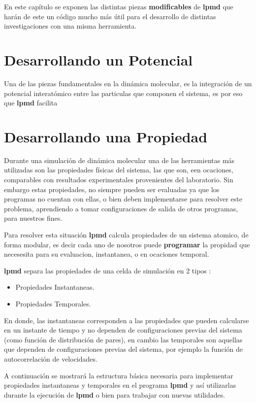 \documentclass[a4paper,10pt]{scrbook}
\newcommand{\lpmd}{\textbf{lpmd }}
\begin{document}
En este cap\'itulo se exponen las distintas piezas \textbf{modificables} de \lpmd que har\'an de este un c\'odigo mucho m\'as \'util para el desarrollo de distintas investigaciones con una misma herramienta.

\section{Desarrollando un Potencial}

Una de las piezas fundamentales en la din\'amica molecular, es la integraci\'on de un potencial interat\'omico entre las particulas que componen el sistema, es por eso que \lpmd facilita 

\section{Desarrollando una Propiedad}

Durante una simulaci\'on de din\'amica molecular una de las herramientas m\'as utilizadas  son las propiedades f\'isicas del sistema, las que son, een ocaciones, comparables con resultados experimentales provenientes del laboratorio. Sin embargo estas propiedades, no siempre pueden ser evaluadas ya que los programas no cuentan con ellas, o bien deben implementarse para resolver este problema, aprendiendo a tomar configuraciones de salida de otros programas, para nuestros fines.

Para resolver esta situaci\'on \lpmd calcula propiedades de un sistema atomico, de forma modular, es decir cada uno de nosotros puede \textbf{programar} la propidad que necesesita para su evaluacion, instantanea, o en ocaciones temporal.

\lpmd separa las propiedades de una celda de simulaci\'on en 2 tipos :

\begin{itemize}
 \item Propiedades Instantaneas.
 \item Propiedades Temporales.
\end{itemize}

En donde, las instantaneas corresponden a las propiedades que pueden calcularse en un instante de tiempo y no dependen de configuraciones previas del sistema (como funci\'on de distribuci\'on de pares), en cambio las temporales son aquellas que dependen de configuraciones previas del sistema, por ejemplo la funci\'on de autocorrelaci\'on de velocidades.

A continuaci\'on se mostrar\'a la estructura b\'asica necesaria para implementar propiedades instantaneas y temporales en el programa \lpmd y as\'i utilizarlas durante la ejecuci\'on de \lpmd o bien para trabajar con nuevas utilidades.
\end{document}
